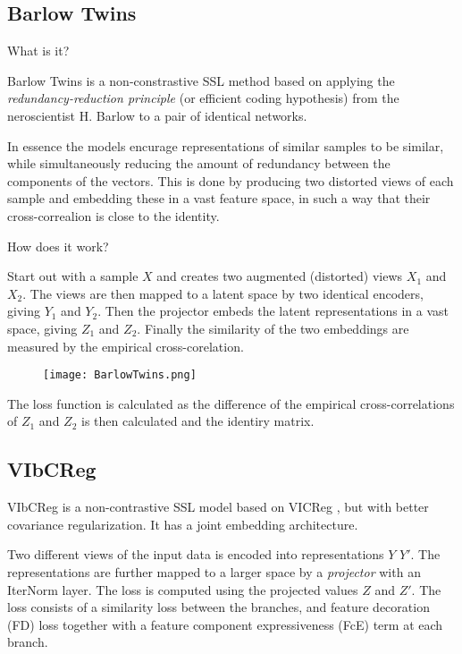 \documentclass[../../thesis.tex]{subfiles}
\begin{document}




\subsection{Barlow Twins}
What is it?

Barlow Twins is a non-constrastive SSL method based on applying the \textit{redundancy-reduction principle} (or efficient coding hypothesis) \cite{Barlow_origin} from the neroscientist H. Barlow to a pair of identical networks. 

In essence the models encurage representations of similar samples to be similar, while simultaneously reducing the amount of redundancy between the components of the vectors. This is done by producing two distorted views of each sample and embedding these in a vast feature space, in such a way that their cross-correalion is close to the identity. 

How does it work?

Start out with a sample $X$ and creates two augmented (distorted) views $X_1$ and $X_2$. The views are then mapped to a latent space by two identical encoders, giving $Y_1$ and $Y_2$. Then the projector embeds the latent representations in a vast space, giving $Z_1$ and $Z_2$. Finally the similarity of the two embeddings are measured by the empirical cross-corelation.

\begin{figure}[h]
    \texttt{[image: BarlowTwins.png]}
    \centering    
    \caption{\cite{zbontar2021barlow}}
\end{figure}

The loss function is calculated as the difference of the empirical cross-correlations of $Z_1$ and $Z_2$ is then calculated and the identiry matrix. 


\subsection{VIbCReg}

VIbCReg \cite{lee2024vibcreg} is a non-contrastive SSL model based on VICReg \cite{bardes2022vicreg}, but with better covariance regularization.  It has a joint embedding architecture. 

Two different views of the input data is encoded into representations $Y$ $Y'$. The representations are further mapped to a larger space by a \textit{projector} with an IterNorm \cite{huang2019iterative} layer. The loss is computed using the projected values $Z$ and $Z'$. \newline
The loss consists of a similarity loss between the branches, and feature decoration (FD) loss together with a feature component expressiveness (FcE) term at each branch. 
\end{document}
